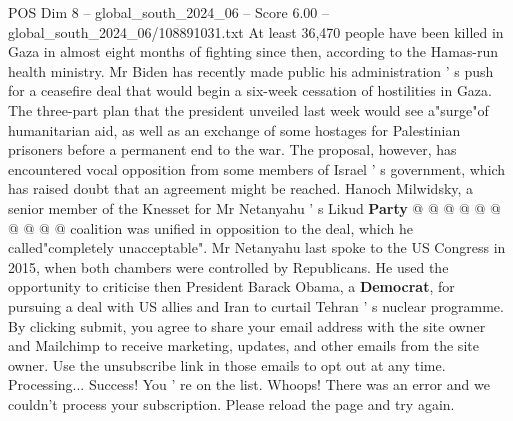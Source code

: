 \begin{textsample}{POS Dim 8 – global\_south\_2024\_06 – Score 6.00 – global\_south\_2024\_06/108891031.txt}
At least 36,470 people have been killed in Gaza in almost eight months of fighting since then, according to the Hamas-run health ministry.
Mr Biden has recently made public his administration ' s push for a ceasefire deal that would begin a six-week cessation of hostilities in Gaza.
The three-part plan that the president unveiled last week would see a"surge"of humanitarian aid, as well as an exchange of some hostages for Palestinian prisoners before a permanent end to the war.
The proposal, however, has encountered vocal opposition from some members of Israel ' s government, which has raised doubt that an agreement might be reached.
Hanoch Milwidsky, a senior member of the Knesset for Mr Netanyahu ' s Likud \textbf{Party} @ @ @ @ @ @ @ @ @ @ coalition was unified in opposition to the deal, which he called"completely unacceptable".
Mr Netanyahu last spoke to the US Congress in 2015, when both chambers were controlled by Republicans.
He used the opportunity to criticise then President Barack Obama, a \textbf{Democrat}, for pursuing a deal with US allies and Iran to curtail Tehran ' s nuclear programme.
By clicking submit, you agree to share your email address with the site owner and Mailchimp to receive marketing, updates, and other emails from the site owner.
Use the unsubscribe link in those emails to opt out at any time.
Processing...
Success!
You ' re on the list.
Whoops!
There was an error and we couldn't process your subscription.
Please reload the page and try again.

\end{textsample}
